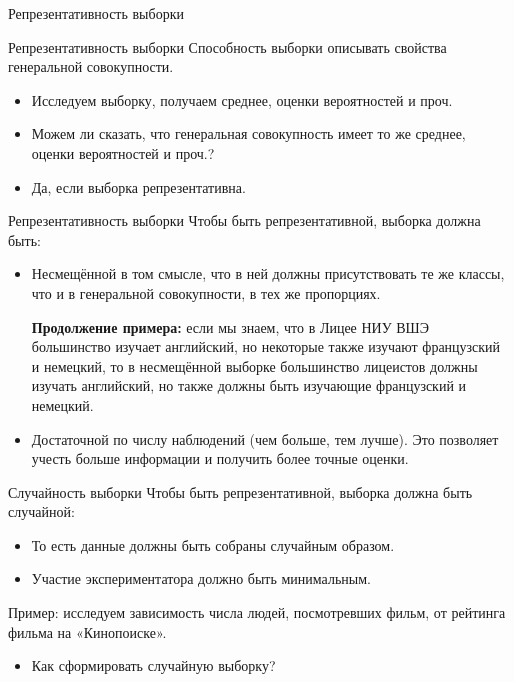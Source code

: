 \documentclass[c, handout]{beamer} %
\begin{document}
	\begin{frame}{Репрезентативность выборки}
		\begin{block}{Репрезентативность выборки}
			Способность выборки описывать свойства генеральной совокупности. 
		\end{block}
		\vspace{3pt}
		\begin{itemize}\setlength\itemsep{1em}
			\item Исследуем выборку, получаем среднее, оценки вероятностей и проч.
			\item Можем ли сказать, что генеральная совокупность имеет то же среднее, оценки вероятностей и проч.?
			\item Да, если выборка репрезентативна. 
		\end{itemize}
	\end{frame}

	\begin{frame}{Репрезентативность выборки}
		Чтобы быть репрезентативной, выборка должна быть:
		\begin{itemize}\setlength\itemsep{1em}
			\item \alert{Несмещённой} в том смысле, что в ней должны присутствовать те же классы, что и в генеральной совокупности, в тех же пропорциях. 
			
			\textbf{Продолжение примера:} если мы знаем, что в Лицее НИУ ВШЭ большинство изучает английский, но некоторые также изучают французский и немецкий, то в несмещённой выборке большинство лицеистов должны изучать английский, но также должны быть изучающие французский и немецкий.
			
			\item<2-> \alert{Достаточной по числу наблюдений} (чем больше, тем лучше). Это позволяет учесть больше информации и получить более точные оценки. 
		\end{itemize}
	\end{frame}

	\begin{frame}{Случайность выборки}
		Чтобы быть репрезентативной, выборка должна быть случайной:
			\begin{itemize}
				\item То есть данные должны быть собраны случайным образом.
				\item Участие экспериментатора должно быть минимальным.  
			\end{itemize}
			\vspace{7pt}
			
			Пример: исследуем зависимость числа людей, посмотревших фильм, от рейтинга фильма на «Кинопоиске».			
			\begin{itemize}
				\item Как сформировать случайную выборку? 
			\end{itemize}
	\end{frame}
	
\end{document}

